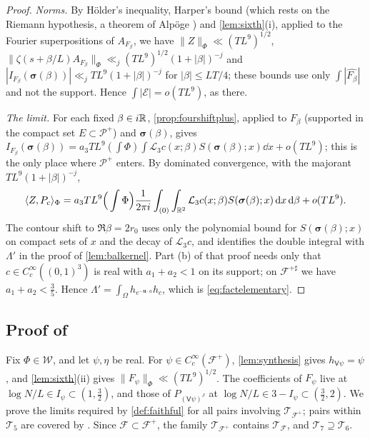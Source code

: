 \documentclass[11pt,colorlinks]{charlie}
\newcommand{\Om}{\Omega}
\newcommand{\ip}[2]{\langle #1,#2\rangle}
\begin{document}
\begin{proof}
\emph{Norms.} By H\"older's inequality, Harper's bound \cite{Harper} (which rests on the Riemann hypothesis, a theorem of Alp\"oge \cite{Alpoge}) and \cref{lem:sixth}(i), applied to the Fourier superpositions of $A_{F_\beta}$, we have $\|Z\|_\Phi\ll(TL^9)^{1/2}$, $\|\zeta(s+\beta/L)A_{F_\beta}\|_\Phi\ll_j(TL^9)^{1/2}(1+|\beta|)^{-j}$ and $|I_{F_\beta}(\boldsymbol\sigma(\beta))|\ll_jTL^9(1+|\beta|)^{-j}$ for $|\beta|\le LT/4$; these bounds use only $\int|\widehat{F_\beta}|$ and not the support. Hence $\int|\mathcal E|=o(TL^9)$, as there.

\emph{The limit.} For each fixed $\beta\in i\mathbb{R}$, \cref{prop:fourshiftplus}, applied to $F_\beta$ (supported in the compact set $E\subset\mathcal P^+$) and $\boldsymbol\sigma(\beta)$, gives $I_{F_\beta}(\boldsymbol\sigma(\beta))=a_3TL^9(\int\Phi)\int\mathcal L_3c(x;\beta)S(\boldsymbol\sigma(\beta);x)\dd x+o(TL^9)$; this is the only place where $\mathcal P^+$ enters. By dominated convergence, with the majorant $TL^9(1+|\beta|)^{-j}$,
\[
 \ip Z{P_c}_\Phi=a_3TL^9\Big(\int\Phi\Big)\frac1{2\pi i}\int_{(0)}\int_{\R^2}\mathcal L_3c(x;\beta)S(\boldsymbol\sigma(\beta);x)\dd x\dd\beta+o(TL^9).
\]
The contour shift to $\Re\beta=2r_0$ uses only the polynomial bound for $S(\boldsymbol\sigma(\beta);x)$ on compact sets of $x$ and the decay of $\mathcal L_3c$, and identifies the double integral with $\Lambda'$ in the proof of \cref{lem:balkernel}. Part (b) of that proof needs only that $c\in C_c^\infty((0,1)^3)$ is real with $a_1+a_2<1$ on its support; on $\mathcal F^{+\sharp}$ we have $a_1+a_2<\frac35$. Hence $\Lambda'=\int_\Om h_{e^{-\boldsymbol u\cdot a}}h_c$, which is \eqref{eq:factelementary}.
\end{proof}

\subsection{Proof of }\label{ssec:mixedrowproof}
Fix $\Phi\in\mathcal W$, and let $\psi,\eta$ be real. For $\psi\in C_c^\infty(\mathcal F^+)$, \cref{lem:synthesis} gives $h_{\mathsf V\psi}=\psi$, and \cref{lem:sixth}(ii) gives $\|F_\psi\|_\Phi\ll(TL^9)^{1/2}$. The coefficients of $F_\psi$ live at $\log N/L\in I_\psi\subset(1,\frac32)$, and those of $P_{(\mathsf V\psi)^J}$ at $\log N/L\in3-I_\psi\subset(\frac32,2)$. We prove the limits required by \cref{def:faithful} for all pairs involving $\mathcal T_{\mathcal F^+}$; pairs within $\mathcal T_5$ are covered by . Since $\mathcal F\subset\mathcal F^+$, the family $\mathcal T_{\mathcal F^+}$ contains $\mathcal T_{\mathcal F}$, and $\mathcal T_7\supseteq\mathcal T_6$.
\end{document}
